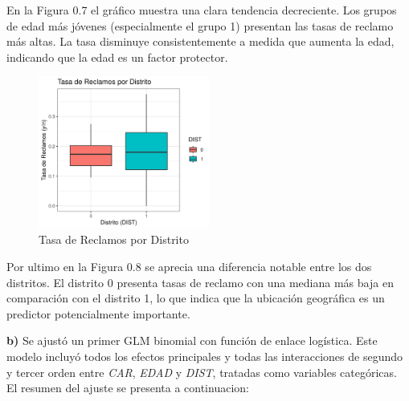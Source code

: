 En la Figura 0.7 el gráfico muestra una clara tendencia decreciente. Los grupos de edad más jóvenes (especialmente el grupo 1) presentan las tasas de reclamo más altas. La tasa disminuye consistentemente a medida que aumenta la edad, indicando que la edad es un factor protector.

\begin{figure}[H]
    \centering
    \includegraphics[width=0.5\textwidth]{images/rate_vs_dist.png}
    \caption{Tasa de Reclamos por Distrito}
    \label{fig:dist_boxplot}
\end{figure}

Por ultimo en la Figura 0.8 se aprecia una diferencia notable entre los dos distritos. El distrito 0 presenta tasas de reclamo con una mediana más baja en comparación con el distrito 1, lo que indica que la ubicación geográfica es un predictor potencialmente importante.

\newpage
\textbf{b)} Se ajustó un primer GLM binomial con función de enlace logística. Este modelo incluyó todos los efectos principales y todas las interacciones de segundo y tercer orden entre \textit{CAR}, \textit{EDAD} y \textit{DIST}, tratadas como variables categóricas. El resumen del ajuste se presenta a continuacion: 


